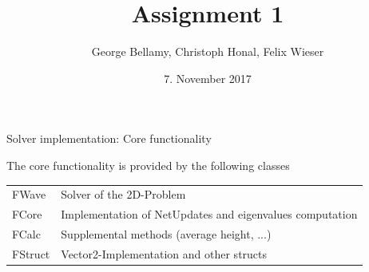 \documentclass[shortpres]{beamer}
\title[{Tsunami simulation}]{Assignment 1}
\author[Bellamy Honal, Wieser]{George Bellamy, Christoph Honal, Felix Wieser\newline\vspace{10pt}{\small Bachelorpraktikum}}
\institute[TU M\"unchen]{Techncal University of Munich}
\date{7. November 2017}
\begin{document}
\maketitle

\begin{frame}{Solver implementation: Core functionality}
	\begin{figure}
		{
			\hspace{20pt}
		}
		\only<2>
		{
			\hspace{20pt}
		}
	\end{figure}
	
	The core functionality is provided by the following classes
	\begin{tabular}{ll}
		FWave & Solver of the 2D-Problem\\
		FCore & Implementation of NetUpdates and eigenvalues computation\\
		\pause
		FCalc & Supplemental methods (average height, ...)\\
		FStruct & Vector2-Implementation and other structs
	\end{tabular}
\end{frame}
\end{document}
